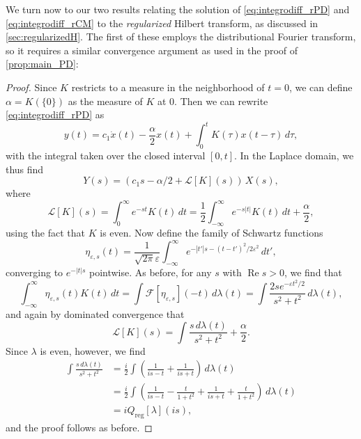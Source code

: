 \documentclass{cams-l} %
\newcommand{\cL}{\mathcal L}
\newcommand{\cF}{\mathcal F}
\newcommand{\eps}{\varepsilon}
\newcommand{\op}{\operatorname}
\renewcommand{\Re}{\op{Re}}
\theoremstyle{definition}
\theoremstyle{remark}
\numberwithin{equation}{section}
\begin{document}
We turn now to our two results relating the solution of \ref{eq:integrodiff_rPD} and \ref{eq:integrodiff_rCM} to the \emph{regularized} Hilbert transform, as discussed in \cref{sec:regularizedH}. The first of these employs the distributional Fourier transform, so it requires a similar convergence argument as used in the proof of \cref{prop:main_PD}:
\propmainrPD*
\begin{proof}
    Since $K$ restricts to a measure in the neighborhood of $t=0$, we can define $\alpha = K(\{0\})$ as the measure of $K$ at $0$. Then we can rewrite \ref{eq:integrodiff_rPD} as
    \[y(t) = c_1\dot{x}(t) - \frac{\alpha}{2} x(t)  + \int_{0}^t K(\tau)x(t-\tau)\,d\tau,\]
    with the integral taken over the closed interval $[0,t]$. In the Laplace domain, we thus find
    \[Y(s) = (c_1s - \alpha/2 + \cL[K](s))\,X(s),\]
where
\[\cL[K](s) = \int_0^\infty e^{-st}K(t)\,dt = \frac{1}{2}\int_{-\infty}^\infty e^{-s|t|}K(t)\,dt + \frac{\alpha}{2},\]
    using the fact that $K$ is even. Now define the family of Schwartz functions 
    \[\eta_{\eps,s}(t) = \frac{1}{\sqrt{2\pi}\eps}\int_{-\infty}^\infty e^{-|t'|s -(t-t')^2/2\eps^2}\,dt',\]
    converging to $e^{-|t|s}$ pointwise. As before, for any $s$ with $\Re s>0$, we find that
    \[\int_{-\infty}^{\infty}\eta_{\eps,s}(t)K(t)\,dt = \int \cF[\eta_{\eps,s}](-t)\,d\lambda(t) = \int \frac{2se^{-\eps t^2/2}}{s^2+t^2}\,d\lambda(t),\]
    and again by dominated convergence that
    \[\cL[K](s) = \int \frac{s\,d\lambda(t)}{s^2+t^2} + \frac{\alpha}{2}.\]
    Since $\lambda$ is even, however, we find\begin{align*}\int\frac{s\,d\lambda(t)}{s^2+t^2}& = \frac{i}{2}\int \left(\frac{1}{is-t} + \frac{1}{is+t}\right)\,d\lambda(t)\\
    &= \frac{i}{2}\int\left(\frac{1}{is-t}-\frac{t}{1+t^2} + \frac{1}{is+t}+\frac{t}{1+t^2}\right)\,d\lambda(t)\\
    &= iQ_\mathrm{reg}[\lambda](is),
    \end{align*}
    and the proof follows as before.
\end{proof}
\end{document}
